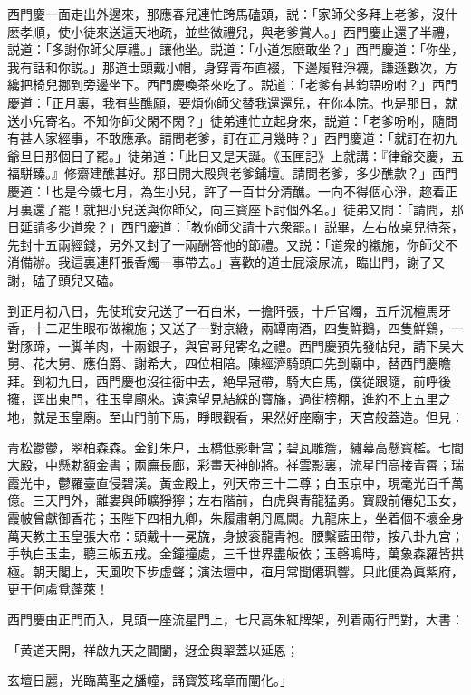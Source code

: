 西門慶一面走出外邊來，那應春兒連忙跨馬磕頭，説：「家師父多拜上老爹，沒什麽孝順，使小徒來送這天地疏，並些微禮兒，與老爹賞人。」西門慶止還了半禮，説道：「多謝你師父厚禮。」讓他坐。説道：「小道怎麽敢坐？」西門慶道：「你坐，我有話和你説。」那道士頭戴小帽，身穿青布直裰，下邊履鞋淨襪，謙遜數次，方纔把椅兒挪到旁邊坐下。西門慶喚茶來吃了。説道：「老爹有甚鈞語吩咐？」西門慶道：「正月裏，我有些醮願，要煩你師父替我還還兒，在你本院。也是那日，就送小兒寄名。不知你師父閑不閑？」徒弟連忙立起身來，説道：「老爹吩咐，隨問有甚人家經事，不敢應承。請問老爹，訂在正月幾時？」西門慶道：「就訂在初九爺旦日那個日子罷。」徒弟道：「此日又是天誕。《玉匣記》上就講：『律爺交慶，五福駢臻。』修齋建醮甚好。那日開大殿與老爹鋪壇。請問老爹，多少醮款？」西門慶道：「也是今歲七月，為生小兒，許了一百廿分清醮。一向不得個心淨，趂着正月裏還了罷！就把小兒送與你師父，向三寳座下討個外名。」徒弟又問：「請問，那日延請多少道衆？」西門慶道：「教你師父請十六衆罷。」説畢，左右放桌兒待茶，先封十五兩經錢，另外又封了一兩酬答他的節禮。又説：「道衆的襯施，你師父不消備辦。我這裏連阡張香燭一事帶去。」喜歡的道士屁滚尿流，臨出門，謝了又謝，磕了頭兒又磕。

到正月初八日，先使玳安兒送了一石白米，一擔阡張，十斤官燭，五斤沉檀馬牙香，十二疋生眼布做襯施；又送了一對京緞，兩罈南酒，四隻鮮鵝，四隻鮮鷄，一對豚蹄，一脚羊肉，十兩銀子，與官哥兒寄名之禮。西門慶預先發帖兒，請下吴大舅、花大舅、應伯爵、謝希大，四位相陪。陳經濟騎頭口先到廟中，替西門慶瞻拜。到初九日，西門慶也沒往衙中去，絶早冠帶，騎大白馬，僕従跟隨，前呼後擁，逕出東門，往玉皇廟來。遠遠望見結綵的寳旛，過街榜棚，進約不上五里之地，就是玉皇廟。至山門前下馬，睜眼觀看，果然好座廟宇，天宫般蓋造。但見：

\begin{myquote}
青松鬱鬱，翠柏森森。金釘朱户，玉橋低影軒宫；碧瓦雕簷，繡幕高懸寳檻。七間大殿，中懸勅額金書；兩廡長廊，彩畫天神帥將。祥雲影裏，流星門高接青霄；瑞霞光中，鬱羅臺直侵碧漢。黃金殿上，列天帝三十二尊；白玉京中，現毫光百千萬億。三天門外，離婁與師曠猙獰；左右階前，白虎與青龍猛勇。寳殿前僊妃玉女，霞帔曾獻御香花；玉陛下四相九卿，朱履肅朝丹鳳闕。九龍床上，坐着個不壞金身萬天教主玉皇張大帝：頭戴十一冕旒，身披衮龍青袍。腰繫藍田帶，按八卦九宫；手執白玉圭，聽三皈五戒。金鐘撞處，三千世界盡皈依；玉磬鳴時，萬象森羅皆拱極。朝天閣上，天風吹下步虚聲；演法壇中，亱月常聞僊珮響。只此便為眞紫府，更于何䖏覓蓬萊！
\end{myquote}

西門慶由正門而入，見頭一座流星門上，七尺高朱紅牌架，列着兩行門對，大書：

\begin{myquote}
「黄道天開，祥啟九天之閶闔，迓金輿翠蓋以延恩；

玄壇日麗，光臨萬聖之旙幢，誦寳笈瑤章而闡化。」
\end{myquote}


